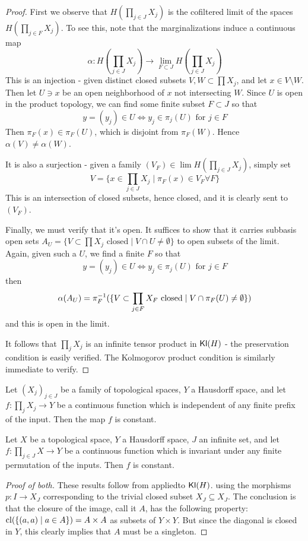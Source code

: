 \documentclass[11pt]{article}
\begin{document}
\begin{proof}
    First we observe that $H(\prod_{j\in J} X_j)$ is the cofiltered limit of the spaces
    $H(\prod_{j\in F} X_j)$.
    To see this, note that the marginalizations induce a continuous map
    \[\alpha: H(\prod_{j\in J} X_j) \to \lim_{F \subset J} H(\prod_{j \in J} X_j)\]
    This is an injection - given distinct closed subsets $V, W \subset \prod X_j$, and let $x \in V \setminus W$.
    Then let $U \ni x$ be an open neighborhood of $x$ not intersecting $W$.
    Since $U$ is open in the product topology, we can find some finite subset $F \subset J$ so that 
    \[y = (y_j) \in U \Leftrightarrow y_j \in \pi_j(U) \text{ for $j\in F$}\]
    Then $\pi_F(x) \in \pi_F(U)$, which is disjoint from $\pi_F(W)$. Hence $\alpha(V) \neq \alpha(W)$.

    It is also a surjection - given a family $(V_F) \in \lim H(\prod_{j \in J} X_j)$, simply set
    \[V = \{x \in \prod_{j\in J} X_j \mid  \pi_F(x) \in V_F \forall F\}\]
    This is an intersection of closed subsets, hence closed, and it is clearly sent to $(V_F)$.

    Finally, we must verify that it's open.
    It suffices to show that it carries subbasis open sets $A_U = \{V \subset \prod X_j \text{ closed} \mid V \cap U \neq \emptyset\}$ to open subsets of the limit.
    Again, given such a $U$, we find a finite $F$ so that
    \[y = (y_j) \in U \Leftrightarrow y_j \in \pi_j(U) \text{ for $j\in F$}\]
    then \[\alpha(A_U) = \pi_F^{-1}(\{V \subset \prod_{j \in F} X_F \text{ closed} \mid V \cap \pi_F(U) \neq \emptyset\})\]
    and this is open in the limit.

    It follows that $\prod_j X_j$ is an infinite tensor product in $\operatorname{\mathsf{Kl}}(H)$ - the preservation condition is easily verified.
    The Kolmogorov product condition is similarly immediate to verify.
\end{proof}
\begin{corollary}
    Let $(X_j)_{j \in J}$ be a family of topological spaces, $Y$ a Hausdorff space, and let $f: \prod_j X_j \to Y$ be a continuous function
    which is independent of any finite prefix of the input.
    Then the map $f$ is constant.
\end{corollary}
\begin{corollary}
	Let $X$ be a topological space, $Y$ a Hausdorff space, $J$ an infinite set, and let $f: \prod_{j\in J} X \to Y$ be a continuous function which is invariant under any finite permutation of the inputs.
    Then $f$ is constant.
\end{corollary}
\begin{proof}[Proof of both]
	These results follow from  appliedto $\operatorname{\mathsf{Kl}}(H)$.
	using the morphisms $p : I \to X_J$ corresponding to the trivial closed subset $X_J \subseteq X_J$.
    The conclusion is that the closure of the image, call it $A$, has the following property: $\operatorname{cl}(\{(a,a) \mid a \in A\}) = A \times A$ as subsets of $Y \times Y$.
    But since the diagonal is closed in $Y$, this clearly implies that $A$ must be a singleton.
\end{proof}




\end{document}
